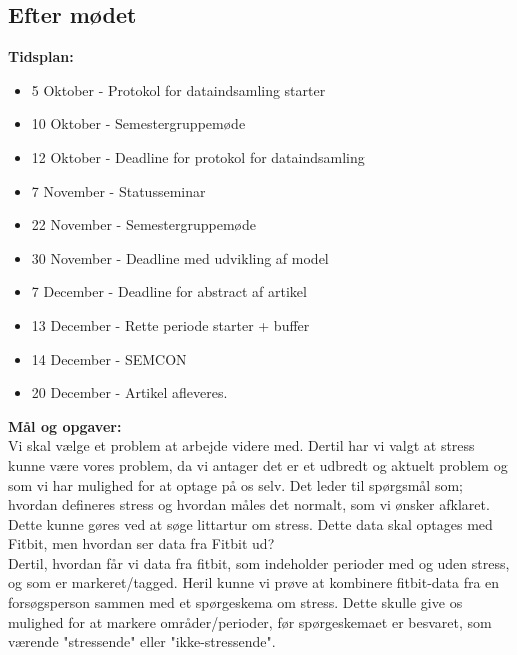 \subsection*{Efter mødet}
\textbf{Tidsplan:}
\begin{itemize}
    \item 5  Oktober  - Protokol for dataindsamling starter
    \item 10 Oktober  - Semestergruppemøde
    \item 12 Oktober  - Deadline for protokol for dataindsamling
    \item 7  November - Statusseminar
    \item 22 November - Semestergruppemøde
    \item 30 November - Deadline med udvikling af model
    \item 7  December - Deadline for abstract af artikel
    \item 13 December - Rette periode starter + buffer
    \item 14 December - SEMCON
    \item 20 December - Artikel afleveres.
\end{itemize}
\textbf{Mål og opgaver:} \\
Vi skal vælge et problem at arbejde videre med. Dertil har vi valgt at stress kunne være vores problem, da vi antager det er et udbredt og aktuelt problem og som vi har mulighed for at optage på os selv. Det leder til spørgsmål som; hvordan defineres stress og hvordan måles det normalt, som vi ønsker afklaret. Dette kunne gøres ved at søge littartur om stress.
Dette data skal optages med Fitbit, men hvordan ser data fra Fitbit ud?\\ 
Dertil, hvordan får vi data fra fitbit, som indeholder perioder med og uden stress, og som er markeret/tagged. Heril kunne vi prøve at kombinere fitbit-data fra en forsøgsperson sammen med et spørgeskema om stress. Dette skulle give os mulighed for at markere områder/perioder, før spørgeskemaet er besvaret, som værende "stressende" eller "ikke-stressende".